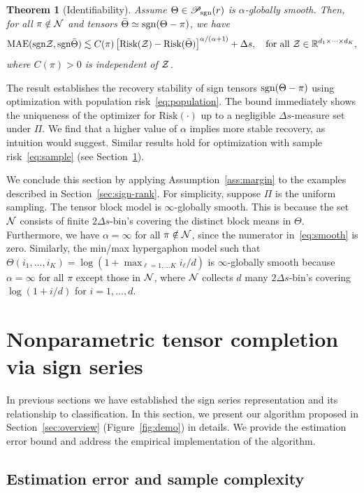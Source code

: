 \documentclass[11pt]{article}
\theoremstyle{plain}
\newtheorem{thm}{Theorem}
\theoremstyle{definition}
\def\sign{\textup{sgn}}
\def\caliP{\mathscr{P}_{\textup{sgn}}}
\begin{document}
\begin{thm}[Identifiability]\label{thm:population}Assume $\Theta\in\caliP(r)$ is $\alpha$-globally smooth. Then, for all $\pi\notin\mathcal{N}$ and tensors $\bar \Theta \simeq \sign(\Theta-\pi)$, we have
\[
\textup{MAE}(\sign \tZ, \sign \bar \Theta) \lesssim C(\pi)\left[\textup{Risk}(\tZ)-\textup{Risk}( \bar \Theta)\right]^{\alpha/(\alpha+1)}+\Delta s, \quad \text{for all }\tZ\in\mathbb{R}^{d_1\times \cdots \times d_K},
\]
where $C(\pi)>0$ is independent of $\mathcal{Z}$. 
\end{thm}
The result establishes the recovery stability of sign tensors $\sign (\Theta-\pi)$ using optimization with population risk~\eqref{eq:population}. The bound immediately shows the uniqueness of the optimizer for $\text{Risk}(\cdot)$ up to a negligible $\Delta s$-measure set under $\Pi$. We find that a higher value of $\alpha$ implies more stable recovery, as intuition would suggest. Similar results hold for optimization with sample risk~\eqref{eq:sample} (see Section~\ref{sec:estimation}). 

We conclude this section by applying Assumption~\ref{ass:margin} to the examples described in Section~\ref{sec:sign-rank}. For simplicity, suppose $\Pi$ is the uniform sampling. 
The tensor block model is $\infty$-globally smooth. This is because the set $\mathcal{N}$ consists of finite $2\Delta s$-bin's covering the distinct block means in $\Theta$. Furthermore, we have $\alpha= \infty$ for all $\pi \notin \mathcal{N}$, since the numerator in~\eqref{eq:smooth} is zero.  Similarly, the min/max hypergaphon model such that  $\Theta(i_1,\ldots,i_K) = \log(1+\max_{\ell = 1,\ldots K}i_\ell/d)$ is $\infty$-globally smooth because $\alpha=\infty$ for all $\pi$ except those in $\mathcal{N}$, where $\mathcal{N}$ collects $d$ many $2\Delta s$-bin's covering $\log(1+i/d)$ for $i =1,\ldots, d$.


\section{Nonparametric tensor completion via sign series}\label{sec:estimation}
In previous sections we have established the sign series representation and its relationship to classification. In this section, we present our algorithm proposed in Section~\ref{sec:overview} (Figure~\ref{fig:demo}) in details. We provide the estimation error bound and address the empirical implementation of the algorithm. 

\subsection{Estimation error and sample complexity}
\end{document}
